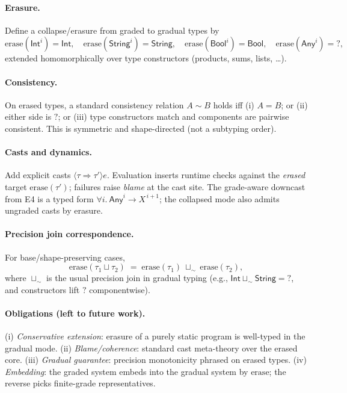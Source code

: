\paragraph{Erasure.}
Define a collapse/erasure from graded to gradual types by
\[
\mathrm{erase}(\mathsf{Int}^{i})=\mathsf{Int},\quad
\mathrm{erase}(\mathsf{String}^{i})=\mathsf{String},\quad
\mathrm{erase}(\mathsf{Bool}^{i})=\mathsf{Bool},\quad
\mathrm{erase}(\mathsf{Any}^{i})=?,
\]
extended homomorphically over type constructors (products, sums, lists, \dots).

\paragraph{Consistency.}
On erased types, a standard consistency relation \(A \mathrel{\sim} B\) holds iff
(i) \(A=B\); or (ii) either side is \(?\); or (iii) type constructors match and components are pairwise consistent.
This is symmetric and shape-directed (not a subtyping order).

\paragraph{Casts and dynamics.}
Add explicit casts \(\langle \tau \Rightarrow \tau'\rangle e\).
Evaluation inserts runtime checks against the \emph{erased} target \(\mathrm{erase}(\tau')\);
failures raise \emph{blame} at the cast site.
The grade-aware downcast from \textsc{E4} is a typed form
\(\forall i.\ \mathsf{Any}^{i} \to X^{\,i+1}\);
the collapsed mode also admits ungraded casts by erasure.

\paragraph{Precision join correspondence.}
For base/shape-preserving cases,
\[
\mathrm{erase}(\tau_1 \sqcup \tau_2)
\;=\;
\mathrm{erase}(\tau_1)\ \sqcup_{\!\sim}\ \mathrm{erase}(\tau_2),
\]
where \(\sqcup_{\!\sim}\) is the usual precision join in gradual typing (e.g., \(\mathsf{Int}\sqcup_{\!\sim}\mathsf{String}=?\), and constructors lift \(?\) componentwise).

\paragraph{Obligations (left to future work).}
(i) \emph{Conservative extension}: erasure of a purely static program is well-typed in the gradual mode. 
(ii) \emph{Blame/coherence}: standard cast meta-theory over the erased core. 
(iii) \emph{Gradual guarantee}: precision monotonicity phrased on erased types. 
(iv) \emph{Embedding}: the graded system embeds into the gradual system by \(\mathrm{erase}\); the reverse picks finite-grade representatives.

